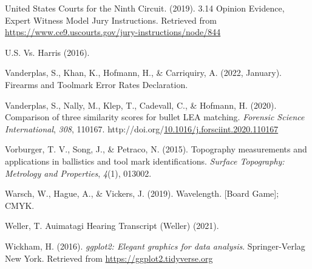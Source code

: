 \documentclass[print]{nuthesis}
\newlength{\cslhangindent}
\newenvironment{CSLReferences}[2]%
{\setlength{\parindent}{0pt}%
\everypar{\setlength{\hangindent}{\cslhangindent}}\ignorespaces}%
{\par}
\begin{document}
\begin{CSLReferences}{1}{0}
\leavevmode{}%
United States Courts for the Ninth Circuit. (2019). 3.14 {Opinion} {Evidence}, {Expert} {Witness} {\textbar} {Model} {Jury} {Instructions}. Retrieved from \url{https://www.ce9.uscourts.gov/jury-instructions/node/844}

\leavevmode{}%
{U.S.} Vs. {Harris} (2016).

\leavevmode{}%
Vanderplas, S., Khan, K., Hofmann, H., \& Carriquiry, A. (2022, January). Firearms and {Toolmark} {Error} {Rates} {Declaration}.

\leavevmode{}%
Vanderplas, S., Nally, M., Klep, T., Cadevall, C., \& Hofmann, H. (2020). Comparison of three similarity scores for bullet {LEA} matching. \emph{Forensic Science International}, \emph{308}, 110167. http://doi.org/\href{https://doi.org/10.1016/j.forsciint.2020.110167}{10.1016/j.forsciint.2020.110167}

\leavevmode{}%
Vorburger, T. V., Song, J., \& Petraco, N. (2015). Topography measurements and applications in ballistics and tool mark identifications. \emph{Surface Topography: Metrology and Properties}, \emph{4}(1), 013002.

\leavevmode{}%
Warsch, W., Hague, A., \& Vickers, J. (2019). Wavelength. {[}Board Game{]}; {CMYK}.

\leavevmode{}%
Weller, T. {Auimatagi} {Hearing} {Transcript} ({Weller}) (2021).

\leavevmode{}%
Wickham, H. (2016). \emph{ggplot2: Elegant graphics for data analysis}. Springer-Verlag New York. Retrieved from \url{https://ggplot2.tidyverse.org}

\end{CSLReferences}


\backmatter

% 






\end{document}
